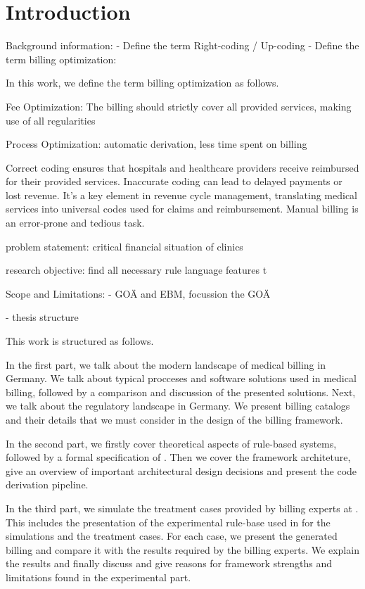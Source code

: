 \chapter{Introduction}\label{ch:introduction}

%


Background information:
- Define the term Right-coding / Up-coding
- Define the term billing optimization:

In this work, we define the term billing optimization as follows.
\begin{description}
    \item Fee Optimization: The billing should strictly cover all provided services, making use of all regularities
    \item Process Optimization: automatic derivation, less time spent on billing
\end{description}
Correct coding ensures that hospitals and healthcare providers receive reimbursed for their provided services.
Inaccurate coding can lead to delayed payments or lost revenue.
It's a key element in revenue cycle management, translating medical services into universal codes used for claims and reimbursement.
Manual billing is an error-prone and tedious task.


problem statement: critical financial situation of clinics

research objective:
find all necessary rule language features t



Scope and Limitations:
- GOÄ and EBM, focussion the GOÄ

- thesis structure

This work is structured as follows.

In the first part, we talk about the modern landscape of medical billing in Germany.
We talk about typical procceses and software solutions used in medical billing, followed by a comparison and discussion of the presented solutions.
Next, we talk about the regulatory landscape in Germany.
We present billing catalogs and their details that we must consider in the design of the billing framework.

In the second part, we firstly cover theoretical aspects of rule-based systems, followed by a formal specification of \RL.
Then we cover the framework architeture, give an overview of important architectural design decisions and present the code derivation pipeline.

In the third part, we simulate the treatment cases provided by billing experts at \AV.
This includes the presentation of the experimental rule-base used in for the simulations and the treatment cases.
For each case, we present the generated billing and compare it with the results required by the billing experts.
We explain the results and finally discuss and give reasons for framework strengths and limitations found in the experimental part.

